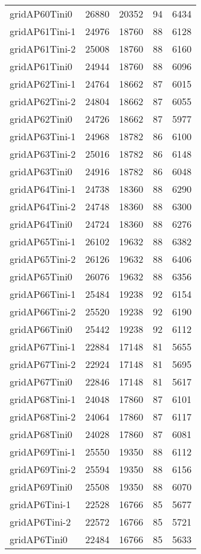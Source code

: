 \begin{tabular}{lrrrr}
gridAP60Tini0 & 26880 & 20352 & 94 & 6434 \\
gridAP61Tini-1 & 24976 & 18760 & 88 & 6128 \\
gridAP61Tini-2 & 25008 & 18760 & 88 & 6160 \\
gridAP61Tini0 & 24944 & 18760 & 88 & 6096 \\
gridAP62Tini-1 & 24764 & 18662 & 87 & 6015 \\
gridAP62Tini-2 & 24804 & 18662 & 87 & 6055 \\
gridAP62Tini0 & 24726 & 18662 & 87 & 5977 \\
gridAP63Tini-1 & 24968 & 18782 & 86 & 6100 \\
gridAP63Tini-2 & 25016 & 18782 & 86 & 6148 \\
gridAP63Tini0 & 24916 & 18782 & 86 & 6048 \\
gridAP64Tini-1 & 24738 & 18360 & 88 & 6290 \\
gridAP64Tini-2 & 24748 & 18360 & 88 & 6300 \\
gridAP64Tini0 & 24724 & 18360 & 88 & 6276 \\
gridAP65Tini-1 & 26102 & 19632 & 88 & 6382 \\
gridAP65Tini-2 & 26126 & 19632 & 88 & 6406 \\
gridAP65Tini0 & 26076 & 19632 & 88 & 6356 \\
gridAP66Tini-1 & 25484 & 19238 & 92 & 6154 \\
gridAP66Tini-2 & 25520 & 19238 & 92 & 6190 \\
gridAP66Tini0 & 25442 & 19238 & 92 & 6112 \\
gridAP67Tini-1 & 22884 & 17148 & 81 & 5655 \\
gridAP67Tini-2 & 22924 & 17148 & 81 & 5695 \\
gridAP67Tini0 & 22846 & 17148 & 81 & 5617 \\
gridAP68Tini-1 & 24048 & 17860 & 87 & 6101 \\
gridAP68Tini-2 & 24064 & 17860 & 87 & 6117 \\
gridAP68Tini0 & 24028 & 17860 & 87 & 6081 \\
gridAP69Tini-1 & 25550 & 19350 & 88 & 6112 \\
gridAP69Tini-2 & 25594 & 19350 & 88 & 6156 \\
gridAP69Tini0 & 25508 & 19350 & 88 & 6070 \\
gridAP6Tini-1 & 22528 & 16766 & 85 & 5677 \\
gridAP6Tini-2 & 22572 & 16766 & 85 & 5721 \\
gridAP6Tini0 & 22484 & 16766 & 85 & 5633 \\

\end{tabular}
